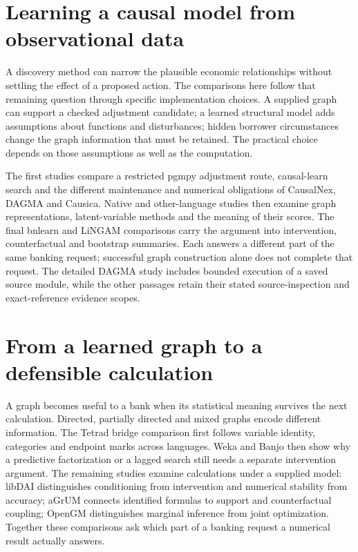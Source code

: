 \documentclass[11pt,a4paper,openany]{book}
\begin{document}
\chapter{Learning a causal model from observational data}
A discovery method can narrow the plausible economic relationships without
settling the effect of a proposed action. The comparisons here follow that
remaining question through specific implementation choices. A supplied graph
can support a checked adjustment candidate; a learned structural model adds
assumptions about functions and disturbances; hidden borrower circumstances
change the graph information that must be retained. The practical choice
depends on those assumptions as well as the computation.

The first studies compare a restricted pgmpy adjustment route, causal-learn
search and the different maintenance and numerical obligations of CausalNex,
DAGMA and Causica. Native and other-language studies then examine graph
representations, latent-variable methods and the meaning of their scores.
The final bnlearn and LiNGAM comparisons carry the argument into intervention,
counterfactual and bootstrap summaries. Each answers a different part of the
same banking request; successful graph construction alone does not complete
that request. The detailed DAGMA study includes bounded execution of a saved
source module, while the other passages retain their stated source-inspection
and exact-reference evidence scopes.












\chapter{From a learned graph to a defensible calculation}
A graph becomes useful to a bank when its statistical meaning survives
the next calculation. Directed, partially directed and mixed graphs encode
different information. The Tetrad bridge comparison first follows variable
identity, categories and endpoint marks across languages. Weka and Banjo then
show why a predictive factorization or a lagged search still needs a separate
intervention argument. The remaining studies examine calculations under a
supplied model: libDAI distinguishes conditioning from intervention and
numerical stability from accuracy; aGrUM connects identified formulas to
support and counterfactual coupling; OpenGM distinguishes marginal inference
from joint optimization. Together these comparisons ask which part of a
banking request a numerical result actually answers.
\end{document}

